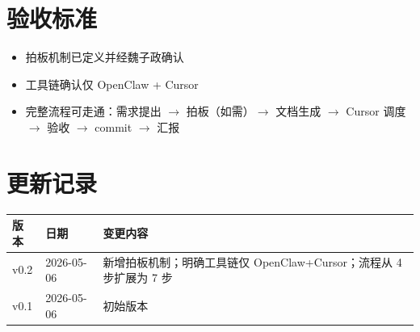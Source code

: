 \documentclass[11pt,a4paper]{article}
\begin{document}
\section{验收标准}

\begin{itemize}
  \item[$\square$] 拍板机制已定义并经魏子政确认
  \item[$\square$] 工具链确认仅 OpenClaw + Cursor
  \item[$\square$] 完整流程可走通：需求提出 $\to$ 拍板（如需）$\to$ 文档生成 $\to$ Cursor 调度 $\to$ 验收 $\to$ commit $\to$ 汇报
\end{itemize}

\section*{更新记录}

\begin{tabular}{lll}
\toprule
版本 & 日期 & 变更内容 \\
\midrule
v0.2 & 2026-05-06 & 新增拍板机制；明确工具链仅 OpenClaw+Cursor；流程从 4 步扩展为 7 步 \\
v0.1 & 2026-05-06 & 初始版本 \\
\bottomrule
\end{tabular}
\end{document}
